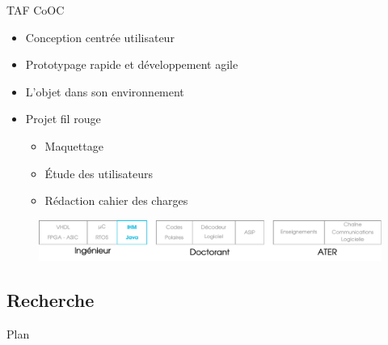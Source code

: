 \documentclass[t,compress,mathserif,12pt,xcolor=dvipsnames]{beamer}
\begin{document}
\begin{frame}[t]{TAF CoOC}
  \begin{minipage}[t][5.0cm][t]{\textwidth}
        \begin{itemize}
          \item Conception centrée utilisateur
          \item Prototypage rapide et développement agile
          \item L'objet dans son environnement
          \item Projet fil rouge
          \begin{itemize}
            \item Maquettage
            \item \'Etude des utilisateurs
            \item Rédaction cahier des charges
          \end{itemize}
        \end{itemize}
  \end{minipage}
  \begin{figure}[htp]
    \centering
    \includegraphics[width=\textwidth]{fig/frise19}
  \end{figure}
\end{frame}

\subsection{Recherche}
\begin{frame}[t]{Plan}
  \centering
  \tableofcontents[
    currentsection,
    currentsubsection,
    sectionstyle=show/show,
    subsectionstyle=show/shaded/shaded,
  ]
\end{frame}
\end{document}

